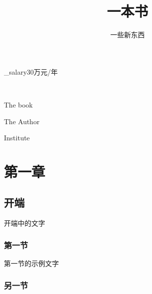 \title{一本书}
\subtitle{一些新东西}
\address{北京市海淀区车公庄西路12号2220}
\expect_salary{30万元/年}
\begin{education}
    \begin{info}
    \end{info}
    \begin{info}
    \end{info}    
\end{education}
\begin{work}
    \
\end{work}



\date{}





\tableofcontents
\begin{titlepage}
	\vspace*{1cm}
	{\huge\raggedright The book\par}
	\noindent\hrulefill\par
	{\LARGE\raggedleft The Author\par}
	\vfill
	{\Large\raggedleft Institute\par}
\end{titlepage}
\part{第一章}
\chapter{开端}
开端中的文字
\section{第一节}
第一节的示例文字
\blindtext
\section{另一节}
\Blindtext
